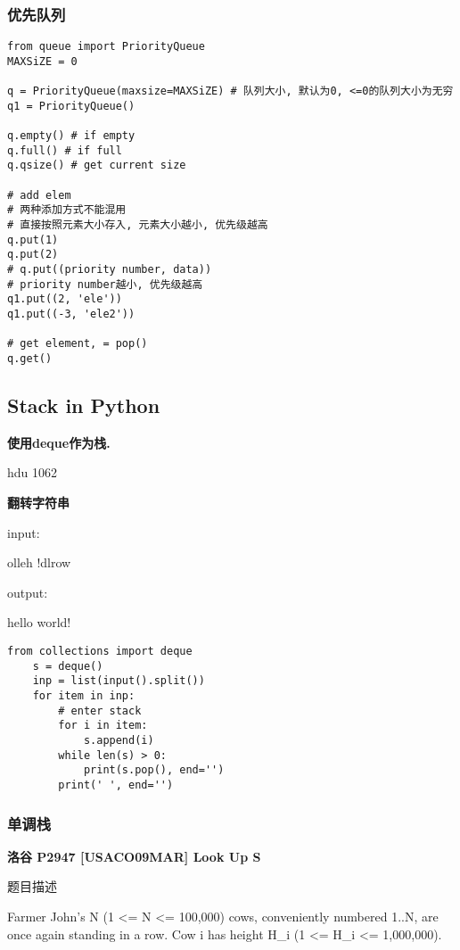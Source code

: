 \documentclass[../main]{subfiles}
\begin{document}
\newpage
\subsubsection{优先队列}

\begin{lstlisting}[style = Python]
from queue import PriorityQueue
MAXSiZE = 0

q = PriorityQueue(maxsize=MAXSiZE) # 队列大小, 默认为0, <=0的队列大小为无穷
q1 = PriorityQueue()

q.empty() # if empty
q.full() # if full
q.qsize() # get current size

# add elem
# 两种添加方式不能混用
# 直接按照元素大小存入, 元素大小越小, 优先级越高
q.put(1) 
q.put(2)
# q.put((priority number, data))
# priority number越小, 优先级越高
q1.put((2, 'ele'))
q1.put((-3, 'ele2'))

# get element, = pop()
q.get()
\end{lstlisting}

\subsection{Stack in Python}

\textbf{使用deque作为栈.}

\indent\par

hdu 1062

\textbf{翻转字符串}

input:

olleh !dlrow

output:

hello world!

\begin{lstlisting}[style = Python]
from collections import deque
    s = deque()
    inp = list(input().split())
    for item in inp:
        # enter stack
        for i in item:
            s.append(i)
        while len(s) > 0:
            print(s.pop(), end='')
        print(' ', end='')
\end{lstlisting}

\newpage
\subsubsection{单调栈}

\textbf{洛谷 P2947 [USACO09MAR] Look Up S}

题目描述

Farmer John's N (1 <= N <= 100,000) cows, conveniently numbered 1..N, are once again standing in a row. Cow i has height H\_i (1 <= H\_i <= 1,000,000).
\end{document}
